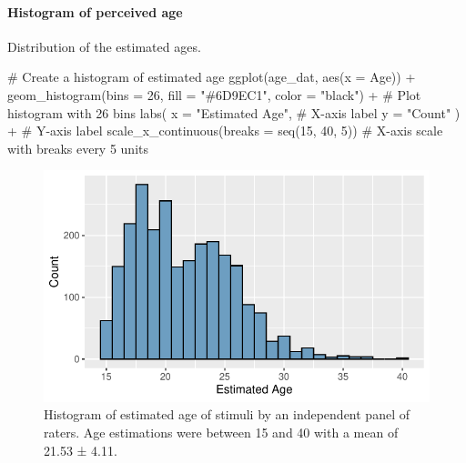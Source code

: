 \documentclass[
  bookmarksnumbered]{article}
\newenvironment{Shaded}{\begin{snugshade}}{\end{snugshade}}
\newcommand{\AttributeTok}[1]{\textcolor[rgb]{0.80,0.80,0.80}{#1}}
\newcommand{\CommentTok}[1]{\textcolor[rgb]{0.50,0.62,0.50}{#1}}
\newcommand{\DecValTok}[1]{\textcolor[rgb]{0.86,0.86,0.80}{#1}}
\newcommand{\FunctionTok}[1]{\textcolor[rgb]{0.94,0.94,0.56}{#1}}
\newcommand{\NormalTok}[1]{\textcolor[rgb]{0.80,0.80,0.80}{#1}}
\newcommand{\SpecialCharTok}[1]{\textcolor[rgb]{0.86,0.64,0.64}{#1}}
\newcommand{\StringTok}[1]{\textcolor[rgb]{0.80,0.58,0.58}{#1}}
\begin{document}
\paragraph{Histogram of perceived age}\label{histogram-of-perceived-age}

Distribution of the estimated ages.

\begin{Shaded}
\begin{Highlighting}[]
\CommentTok{\# Create a histogram of estimated age}
\FunctionTok{ggplot}\NormalTok{(age\_dat, }\FunctionTok{aes}\NormalTok{(}\AttributeTok{x =}\NormalTok{ Age)) }\SpecialCharTok{+}
  \FunctionTok{geom\_histogram}\NormalTok{(}\AttributeTok{bins =} \DecValTok{26}\NormalTok{, }\AttributeTok{fill =} \StringTok{"\#6D9EC1"}\NormalTok{, }\AttributeTok{color =} \StringTok{"black"}\NormalTok{) }\SpecialCharTok{+} \CommentTok{\# Plot histogram with 26 bins}
  \FunctionTok{labs}\NormalTok{(}
    \AttributeTok{x =} \StringTok{"Estimated Age"}\NormalTok{, }\CommentTok{\# X{-}axis label}
    \AttributeTok{y =} \StringTok{"Count"}
\NormalTok{  ) }\SpecialCharTok{+} \CommentTok{\# Y{-}axis label}
  \FunctionTok{scale\_x\_continuous}\NormalTok{(}\AttributeTok{breaks =} \FunctionTok{seq}\NormalTok{(}\DecValTok{15}\NormalTok{, }\DecValTok{40}\NormalTok{, }\DecValTok{5}\NormalTok{)) }\CommentTok{\# X{-}axis scale with breaks every 5 units}
\end{Highlighting}
\end{Shaded}

\begin{figure}
\centering
\includegraphics{Supplementary_material_files/figure-latex/estimated-age-hist-1.pdf}
\caption{\label{fig:estimated-age-hist}Histogram of estimated age of stimuli by an independent panel of raters. Age estimations were between 15 and 40 with a mean of 21.53 ± 4.11.}
\end{figure}
\end{document}
